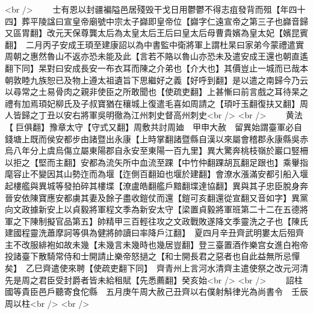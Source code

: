 <br />
　　士有恩以封疆褊隘邑居殘毁干戈日用鬱鬱不得志疽發背而殂【年四十四】葬平陵諡曰宣皇帝廟號中宗太子巋即皇帝位【巋字仁遠宣帝之第三子也巋音歸又區胃翻】改元天保尊龔太后為太皇太后王后曰皇太后母曹貴嬪為皇太妃【嬪昆賓翻】　二月丙子安成王頊至建康詔以為中書監中衛將軍上謂杜杲曰家弟今蒙禮遣實周朝之惠然魯山不返亦恐未能及此【言若不賂以魯山亦恐未及遣安成王還也朝直遙翻下同】杲對曰安成長安一布衣耳而陳之介弟也【介大也】其價豈止一城而已哉本朝敦睦九族恕已及物上遵太祖遺旨下思繼好之義【好呼到翻】是以遣之南歸今乃云以尋常之土易骨肉之親非使臣之所敢聞也【使疏吏翻】上甚慚曰前言戲之耳待杲之禮有加焉頊妃柳氏及子叔寶猶在穰城上復遣毛喜如周請之【頊吁玉翻復扶又翻】周人皆歸之丁丑以安右將軍吳明徹為江州刺史督高州刺史<br />
<br />
　　黄法【巨俱翻】豫章太守【守式又翻】周敷共討周廸　甲申大赦　留異始謂臺軍必自錢塘上既而侯安都步由諸暨出永康【上時掌翻諸暨縣自漢以來屬會稽郡永康縣吳赤烏八年分上虞烏傷立屬東陽郡自永安至東陽一百九里】異大驚奔桃枝嶺於巖口竪柵以拒之【堅而主翻】安都為流矢所中血流至踝【中竹仲翻踝胡瓦翻足跟也】乘轝指麾容止不變因其山勢迮而為堰【迮側百翻廹也堰於建翻】會潦水漲滿安都引船入堰起樓艦與異城等發拍碎其樓堞【潦盧皓翻艦戶黯翻堞達協翻】異與其子忠臣脫身奔晉安依陳寶應安都虜其妻及餘子盡收鎧仗而還【鎧可亥翻還從宣翻又音如字】異黨向文政據新安上以貞毅將軍程文季為新安太守【梁置貞毅將軍班第二十二在五德將軍之下陳制擬官品第五】帥精甲三百輕往攻之文政戰敗遂降文季靈洗之子也【陳氏建國程靈洗蕭摩訶等俱為健將帥讀曰率降戶江翻】　夏四月辛丑齊武明婁太后殂齊主不改服緋袍如故未幾【未幾言未幾時也幾居豈翻】登三臺置酒作樂宫女進白袍帝投諸臺下散騎常侍和士開請止樂帝怒撾之【和士開長君之惡者也自此益無所忌憚矣】　乙巳齊遣使來聘【使疏吏翻下同】　齊青州上言河水清齊主遣使祭之改元河清先是周之君臣受封爵者皆未給租賦【先悉薦翻】癸亥始<br />
<br />
　　詔柱國等貴臣邑戶聽寄食佗縣　五月庚午周大赦己丑齊以右僕射斛律光為尚書令　壬辰周以柱<br />
<br />
